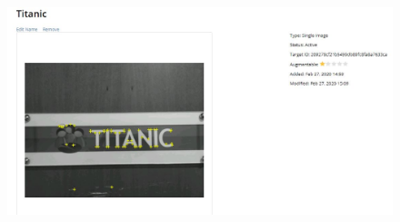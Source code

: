 \documentclass{aifyp}
\begin{document}
\begin{appendices}
\begin{figure}[H]
\begin{minipage}{.5\textwidth}
          \label{fig:TakanamiImageTarget}
        \end{minipage}%
        \begin{minipage}{.5\textwidth}
          \centering
          \includegraphics[scale=0.3]{Images/Chapter6/TitanicImageTargets.JPG}
          \label{fig:TitanicImageTarget}
        \end{minipage}
\end{figure}

\end{appendices}
\end{document}
